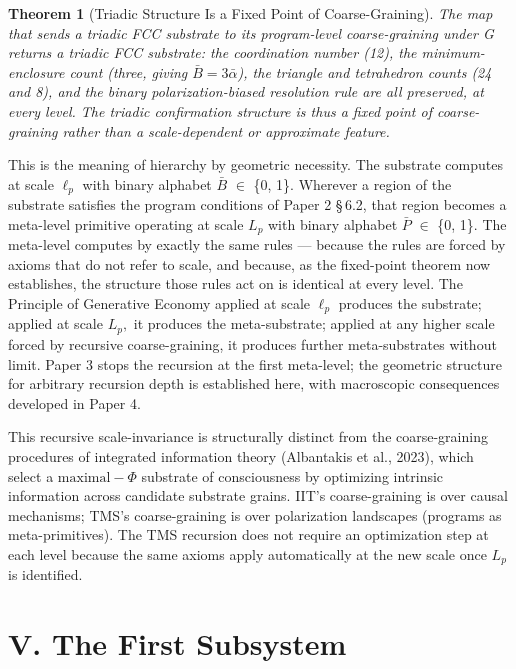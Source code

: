 \documentclass[11pt,oneside]{report}
\newtheorem{theorem}{Theorem}[section]
\theoremstyle{definition}
\theoremstyle{remark}
\begin{document}
\begin{theorem}[Triadic Structure Is a Fixed Point of Coarse-Graining]
The map that sends a triadic FCC substrate to its program-level coarse-graining
under G returns a triadic FCC substrate: the coordination number (12), the
minimum-enclosure count (three, giving \ensuremath{\bar{B} = 3\bar{\alpha}}), the triangle and
tetrahedron counts (24 and 8), and the binary polarization-biased resolution rule
are all preserved, at every level. The triadic confirmation structure is thus a
fixed point of coarse-graining rather than a scale-dependent or approximate
feature.
\end{theorem}

This is the meaning of hierarchy by geometric necessity. The substrate
computes at scale \ensuremath{\ell_{p}} with binary alphabet \ensuremath{\bar{B}} \ensuremath{\in} \{0, 1\}. Wherever a
region of the substrate satisfies the program conditions of Paper 2
\S\,6.2, that region becomes a meta-level primitive operating at scale \ensuremath{L_{p}}
with binary alphabet \ensuremath{\bar{P}} \ensuremath{\in} \{0, 1\}. The meta-level computes by exactly
the same rules --- because the rules are forced by axioms that do not
refer to scale, and because, as the fixed-point theorem now establishes, the
structure those rules act on is identical at every level. The Principle of
Generative Economy applied at scale \ensuremath{\ell_{p}}
produces the substrate; applied at scale \ensuremath{L_{p},} it produces the
meta-substrate; applied at any higher scale forced by recursive
coarse-graining, it produces further meta-substrates without limit.
Paper 3 stops the recursion at the first meta-level; the geometric
structure for arbitrary recursion depth is established here, with
macroscopic consequences developed in Paper 4.

This recursive scale-invariance is structurally distinct from the
coarse-graining procedures of integrated information theory (Albantakis
et al., 2023), which select a \ensuremath{\text{maximal}-\Phi} substrate of consciousness by
optimizing intrinsic information across candidate substrate grains.
IIT's coarse-graining is over causal mechanisms; TMS's coarse-graining
is over polarization landscapes (programs as meta-primitives). The TMS
recursion does not require an optimization step at each level because
the same axioms apply automatically at the new scale once \ensuremath{L_{p}} is
identified.

\section*{V. The First Subsystem}
\end{document}
